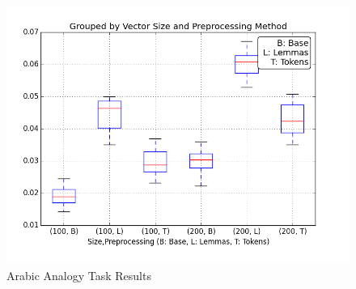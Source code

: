 \begin{figure}
  \includegraphics[width=\linewidth]{results_analogy/ar_analogy_results_fixed_plot.png}
  \caption{Arabic Analogy Task Results}
  \label{fig:aranalogy}
\end{figure}






















